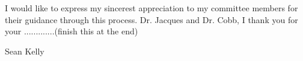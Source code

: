 \begin{acknowledgements}


I would like to express my sincerest appreciation to my committee members for their guidance through this process. Dr. Jacques and Dr. Cobb, I thank you for your .............(finish this at the end)

\vspace*{20mm}

\hspace*{7cm} Sean Kelly
\end{acknowledgements}
